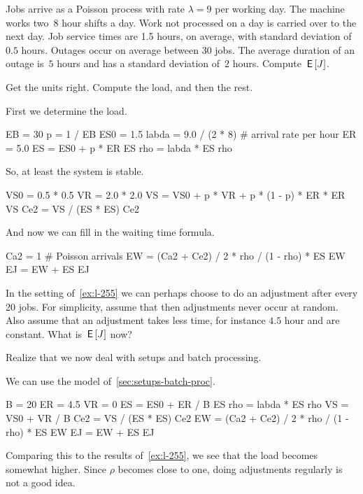 \documentclass[stochastic-or.tex]{subfiles}
\begin{document}
\begin{exercise}\label{ex:l-255}
Jobs arrive as a Poisson process with rate $\lambda=9$ per working day.
The machine works two~$8$ hour shifts a day.
Work not processed on a day is carried over to the next day.
Job service times are 1.5 hours, on average, with standard deviation of $0.5$ hours.
Outages occur on average between $30$ jobs.
The average duration of an outage is~$5$ hours and has a standard deviation of~$2$ hours.
Compute $\,\mathsf{E}\left[J\right]$.
\begin{hint}
 Get the units right.  Compute the load, and then the rest.
\end{hint}
\begin{solution}
First we determine the load.
\begin{pyconsole}
EB = 30
p = 1 / EB
ES0 = 1.5
labda = 9.0 / (2 * 8)  # arrival rate per hour
ER = 5.0
ES = ES0 + p * ER
ES
rho = labda * ES
rho
\end{pyconsole}
So, at least the system is stable.
\begin{pyconsole}
VS0 = 0.5 * 0.5
VR = 2.0 * 2.0
VS = VS0 + p * VR + p * (1 - p) * ER * ER
VS
Ce2 = VS / (ES * ES)
Ce2
\end{pyconsole}
And now we can fill in the waiting time formula.
\begin{pyconsole}
Ca2 = 1  # Poisson arrivals
EW = (Ca2 + Ce2) / 2 * rho / (1 - rho) * ES
EW
EJ = EW + ES
EJ
\end{pyconsole}
\end{solution}
\end{exercise}


\begin{exercise}\label{ex:104}
In the setting of~\cref{ex:l-255} we can perhaps choose to do an adjustment after every 20 jobs.
For simplicity, assume that then adjustments never occur at random.
Also assume that an adjustment takes less time, for instance $4.5$ hour and are constant.
What is $\,\mathsf{E}\left[J\right]$ now?
\begin{hint}
Realize that we now deal with setups and batch processing.
\end{hint}
\begin{solution}
We can use the model of~\cref{sec:setups-batch-proc}.
\begin{pyconsole}
B = 20
ER = 4.5
VR = 0
ES = ES0 + ER / B
ES
rho = labda * ES
rho
VS = VS0 + VR / B
Ce2 = VS / (ES * ES)
Ce2
EW = (Ca2 + Ce2) / 2 * rho / (1 - rho) * ES
EW
EJ = EW + ES
EJ
\end{pyconsole}
Comparing this to the results of~\cref{ex:l-255}, we see that the load becomes somewhat higher. Since $\rho$ becomes close to one, doing adjustments regularly is not a good idea.
\end{solution}
\end{exercise}
\end{document}
